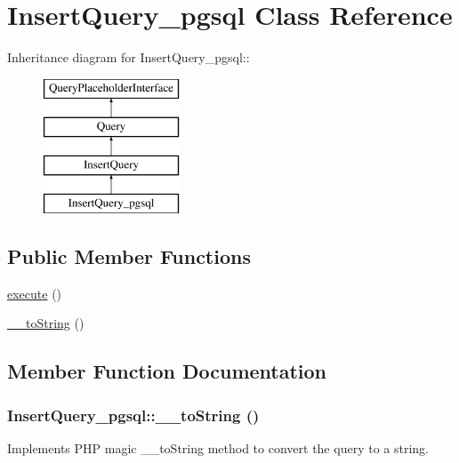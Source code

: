 \hypertarget{classInsertQuery__pgsql}{
\section{InsertQuery\_\-pgsql Class Reference}
\label{classInsertQuery__pgsql}
}
Inheritance diagram for InsertQuery\_\-pgsql::\begin{figure}[H]
\begin{center}
\leavevmode
\includegraphics[height=4cm]{classInsertQuery__pgsql}
\end{center}
\end{figure}
\subsection*{Public Member Functions}
\begin{DoxyCompactItemize}
\item 
\hyperlink{classInsertQuery__pgsql_a554ec18b9f8003d0252fa754ab9217d3}{execute} ()
\item 
\hyperlink{classInsertQuery__pgsql_a784c39f2e4fa911ecb893243fcb3ab91}{\_\-\_\-toString} ()
\end{DoxyCompactItemize}


\subsection{Member Function Documentation}
\hypertarget{classInsertQuery__pgsql_a784c39f2e4fa911ecb893243fcb3ab91}{
\subsubsection[{\_\-\_\-toString}]{\setlength{\rightskip}{0pt plus 5cm}InsertQuery\_\-pgsql::\_\-\_\-toString ()}}
\label{classInsertQuery__pgsql_a784c39f2e4fa911ecb893243fcb3ab91}
Implements PHP magic \_\-\_\-toString method to convert the query to a string.

